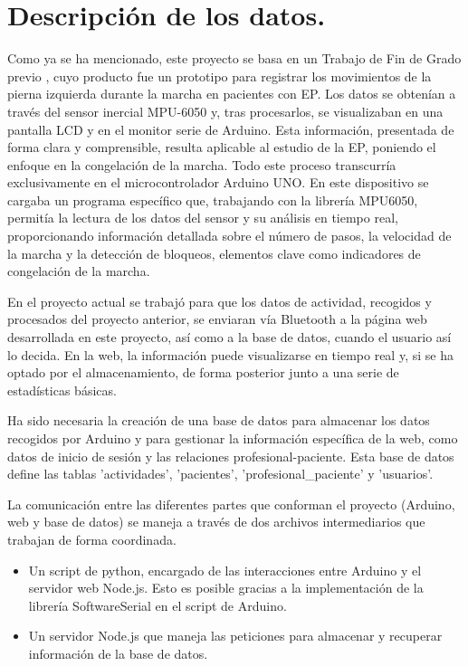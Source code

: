 
\section{Descripción de los datos.}

Como ya se ha mencionado, este proyecto se basa en un Trabajo de Fin de Grado previo \cite{saragonz91:online}, cuyo producto fue un prototipo para registrar los movimientos de la pierna izquierda durante la marcha en pacientes con EP. Los datos se obtenían a través del sensor inercial MPU-6050 y, tras procesarlos, se visualizaban en una pantalla LCD y en el monitor serie de Arduino. Esta información, presentada de forma clara y comprensible, resulta aplicable al estudio de la EP, poniendo el enfoque en la congelación de la marcha. Todo este proceso transcurría exclusivamente en el microcontrolador Arduino UNO. En este dispositivo se cargaba un programa específico que, trabajando con la librería MPU6050, permitía la lectura de los datos del sensor y su análisis en tiempo real, proporcionando información detallada sobre el número de pasos, la velocidad de la marcha y la detección de bloqueos, elementos clave como indicadores de congelación de la marcha.

En el proyecto actual se trabajó para que los datos de actividad, recogidos y procesados del proyecto anterior, se enviaran vía Bluetooth a la página web desarrollada en este proyecto, así como a la base de datos, cuando el usuario así lo decida. En la web, la información puede visualizarse en tiempo real y, si se ha optado por el almacenamiento, de forma posterior junto a una serie de estadísticas básicas.

Ha sido necesaria la creación de una base de datos para almacenar los datos recogidos por Arduino y para gestionar la información específica de la web, como datos de inicio de sesión y las relaciones profesional-paciente. Esta base de datos define las tablas 'actividades', 'pacientes', 'profesional\_paciente' y 'usuarios'.

La comunicación entre las diferentes partes que conforman el proyecto (Arduino, web y base de datos) se maneja a través de dos archivos intermediarios que trabajan de forma coordinada. 
\begin{itemize}
    \item Un script de python, encargado de las interacciones entre Arduino y el servidor web Node.js. Esto es posible gracias a la implementación de la librería SoftwareSerial en el script de Arduino.
    \item Un servidor Node.js que maneja las peticiones para almacenar y recuperar información de la base de datos.
\end{itemize}


